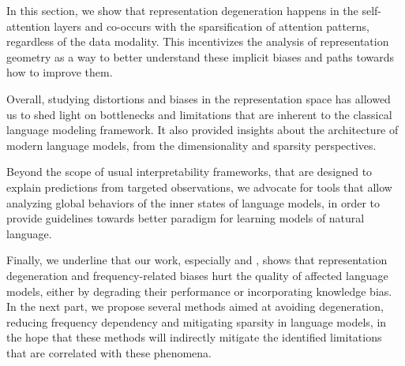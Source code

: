 In this section, we show that representation degeneration happens in the self-attention layers and co-occurs with the sparsification of attention patterns, regardless of the data modality. This incentivizes the analysis of representation geometry as a way to better understand these implicit biases and paths towards how to improve them. 

\vspace{4em}


Overall, studying distortions and biases in the representation space has allowed us to shed light on bottlenecks and limitations that are inherent to the classical language modeling framework. It also provided insights about the architecture of modern language models, from the dimensionality and sparsity perspectives. 

Beyond the scope of usual interpretability frameworks, that are designed to explain predictions from targeted observations, we advocate for tools that allow analyzing global behaviors of the inner states of language models, in order to provide guidelines towards better paradigm for learning models of natural language.

Finally, we underline that our work, especially  and , shows that representation degeneration and frequency-related biases hurt the quality of affected language models, either by degrading their performance or incorporating knowledge bias. In the next part, we propose several methods aimed at avoiding degeneration, reducing frequency dependency and mitigating sparsity in language models, in the hope that these methods will indirectly mitigate the identified limitations that are correlated with these phenomena.



